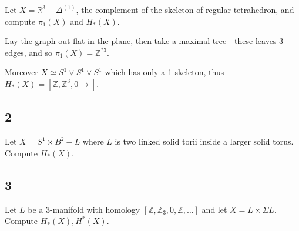 Let \(X = {\mathbb{R}}^3 - \Delta^{(1)}\), the complement of the
skeleton of regular tetrahedron, and compute \(\pi_1(X)\) and
\(H_*(X)\).

\begin{solution}

Lay the graph out flat in the plane, then take a maximal tree - these
leaves 3 edges, and so \(\pi_1(X) = {\mathbb{Z}}^{\ast 3}\).

Moreover \(X \simeq S^1\vee S^1 \vee S^1\) which has only a 1-skeleton,
thus \(H_*(X) = [{\mathbb{Z}}, {\mathbb{Z}}^3, 0\rightarrow]\).

\end{solution}

\hypertarget{section-1}{%
\subsection{2}\label{section-1}}

Let \(X = S^1 \times B^2 - L\) where \(L\) is two linked solid torii
inside a larger solid torus. Compute \(H_*(X)\). 

\hypertarget{section-2}{%
\subsection{3}\label{section-2}}

Let \(L\) be a 3-manifold with homology
\([{\mathbb{Z}}, {\mathbb{Z}}_3, 0, {\mathbb{Z}}, \ldots]\) and let
\(X = L \times\Sigma L\). Compute \(H_*(X), H^*(X)\).


